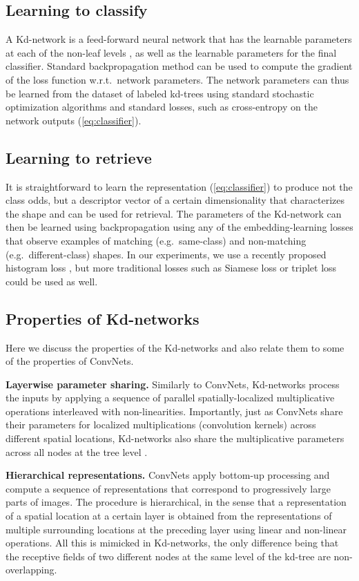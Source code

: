 \documentclass[10pt,twocolumn,letterpaper]{article}
\newcommand{\eq}[1]{(\ref{eq:#1})}
\begin{document}
\subsection{Learning to classify}
A Kd-network is a feed-forward neural network that has the learnable parameters  at each of the  non-leaf levels , as well as the learnable parameters  for the final classifier. Standard backpropagation method can be used to compute the gradient of the loss function w.r.t.\ network parameters. The network parameters can thus be learned from the dataset of labeled kd-trees using standard stochastic optimization algorithms and standard losses, such as cross-entropy on the network outputs  \eq{classifier}.

\subsection{Learning to retrieve}
It is straightforward to learn the representation \eq{classifier} to produce not the class odds, but a descriptor vector of a certain dimensionality that characterizes the shape and can be used for retrieval. The parameters of the Kd-network can then be learned using backpropagation using any of the embedding-learning losses that observe examples of matching (e.g.\ same-class) and non-matching (e.g.\ different-class) shapes. In our experiments, we use a recently proposed histogram loss \cite{Ustinova16}, but more traditional losses such as Siamese loss \cite{Bromley93,Chopra05} or triplet loss \cite{Schultz04} could be used as well.

\subsection{Properties of Kd-networks}
Here we discuss the properties of the Kd-networks and also relate them to some of the properties of ConvNets.

\textbf{Layerwise parameter sharing.} Similarly to ConvNets, Kd-networks process the inputs by applying a sequence of parallel spatially-localized multiplicative operations interleaved with non-linearities. Importantly, just as ConvNets share their parameters for localized multiplications (convolution kernels) across different spatial locations, Kd-networks also share the multiplicative parameters  across all nodes at the tree level .

\textbf{Hierarchical representations.} ConvNets apply bottom-up processing and compute a sequence of representations that correspond to progressively large parts of images. The procedure is hierarchical, in the sense that a representation of a spatial location at a certain layer is obtained from the representations of multiple surrounding locations at the preceding layer using linear and non-linear operations. All this is mimicked in Kd-networks, the only difference being that the receptive fields of two different nodes at the same level of the kd-tree are non-overlapping.
\end{document}
